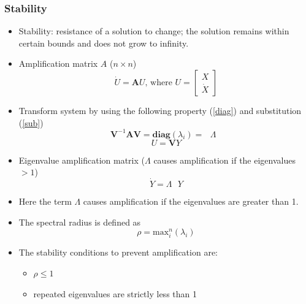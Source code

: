 \documentclass[xcolor=svgnames,9pt]{beamer}
\theoremstyle{remark}
\begin{document}
		\begin{frame}
  			\frametitle{Stability}
			\begin{itemize}
				\item  Stability: resistance of a solution to change; the solution remains within certain bounds and does not grow to infinity.
				\item Amplification matrix $A$ ($n \times n$)
					\begin{equation}
						\dot{U} = \textbf{A}U
						\text{, where } U = 
							\begin{bmatrix}
								X\\\dot{X}
							\end{bmatrix}
					\end{equation} 
				\item Transform system by using the following property (\ref{diag}) and substitution (\ref{sub})
					\begin{equation}\label{diag}
						\textbf{V}^{-1} \textbf{A} \textbf{V}= \textbf{diag} (\lambda_i) = \textbf{ $\Lambda$ }
					\end{equation}
					\begin{equation}\label{sub}
						U = \textbf{V}Y
					\end{equation}
				\item Eigenvalue amplification matrix ($\textbf{$\Lambda$}$ causes amplification if the eigenvalues $> 1$)
					\begin{equation}
						\dot{Y} = \textbf{$\Lambda$ }Y
					\end{equation}	
				\item Here the term $\textbf{$\Lambda$}$ causes amplification if the eigenvalues are greater than 1.
				\item The spectral radius is defined as
					\begin{equation*}
						\rho = \text{max}_i^n(\lambda_i)
					\end{equation*}
				\item The stability conditions to prevent amplification are:
					\begin{itemize}	
						\item $\rho \leq 1$ 
						\item repeated eigenvalues are strictly less than 1
					\end{itemize}
			\end{itemize}
		\end{frame}
\end{document}
